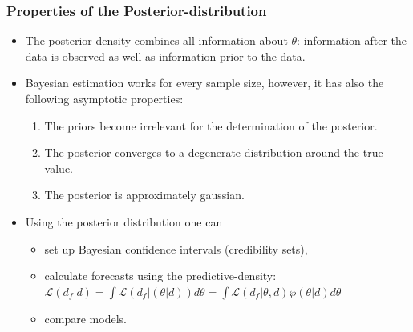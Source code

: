 \documentclass[handout]{beamer}  %
\begin{document}
\begin{frame}\frametitle{Properties of the Posterior-distribution}
\begin{itemize}
  \item The posterior density combines all information about ${\theta}$: information after the data is observed as well as information prior to the data.
  \item Bayesian estimation works for every sample size, however, it has also the following asymptotic properties:
    \begin{enumerate}
      \item The priors become irrelevant for the determination of the posterior.
      \item The posterior converges to a degenerate distribution around the true value.
      \item The posterior is approximately gaussian.
    \end{enumerate}
  \item Using the posterior distribution one can
  \begin{itemize}
  \item set up Bayesian confidence intervals (credibility sets),
  \item calculate forecasts using the predictive-density: $\mathcal{L}({d_f}|{d})= \int \mathcal{L}({d_f}|({\theta}|{d})){d} {\theta} = \int \mathcal{L}({d_f}|{\theta},{d})\wp({\theta}|{d}){d}{\theta}$
  \item compare models.
\end{itemize}
\end{itemize}
\end{frame}
\end{document}

